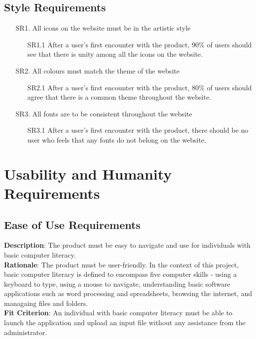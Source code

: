 \documentclass[12pt]{article}
\begin{document}
\subsection{Style Requirements}
\begin{itemize}
  \item [SR1.] All icons on the website must be in the artistic style
  \begin{itemize}
    \item [SR1.1] After a user's first encounter with the product, 90\% of users
    should see that there is unity among all the icons on the website. 
  \end{itemize}
  \item [SR2.] All colours must match the theme of the website
  \begin{itemize}
    \item [SR2.1] After a user's first encounter with the product, 80\% of users
    should agree that there is a common theme throughout the website.
  \end{itemize}
  \item [SR3.] All fonts are to be consistent throughout the website 
  \begin{itemize}
    \item [SR3.1] After a user's first encounter with the product, there should
    be no user who feels that any fonts do not belong on the website. 
  \end{itemize}
\end{itemize}

\section{Usability and Humanity Requirements}
\subsection{Ease of Use Requirements}
\textbf{Description}: The product must be easy to navigate and use for
individuals with basic computer literacy.\\
\textbf{Rationale}: The product must be user-friendly. In the context of this
project, basic computer literacy is defined to encompass five computer skills -
using a keyboard to type, using a mouse to navigate, understanding basic
software applications such as word processing and spreadsheets, browsing the
internet, and managaing files and folders.\\ 
\textbf{Fit Criterion}: An individual with basic computer literacy must be able
to launch the application and upload an input file without any assistance from
the administrator.
\end{document}
